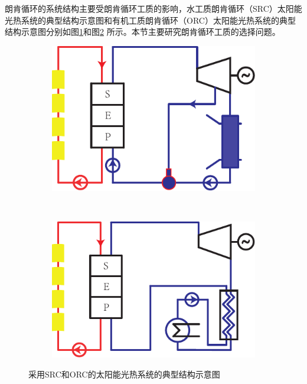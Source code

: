 朗肯循环的系统结构主要受朗肯循环工质的影响，水工质朗肯循环（SRC）太阳能光热系统的典型结构示意图和有机工质朗肯循环（ORC）太阳能光热系统的典型结构示意图分别如图\ref{fig:TypicalSteamRankineSolarSystem}和图\ref{fig:TypicalOrganicRankineSolarSystem}
所示。本节主要研究朗肯循环工质的选择问题。

\noindent \begin{figure}[htbp]
\centering
	\begin{subfigure}[b]{0.4\columnwidth}
	\includegraphics[width = \columnwidth]{fig/TypicalSteamRankineSolarSystem}
	\caption{}\label{fig:TypicalSteamRankineSolarSystem}
	\end{subfigure}
	~
\begin{subfigure}[b]{0.4\columnwidth}
	\includegraphics[width = \columnwidth]{fig/TypicalOrganicRankineSolarSystem}
	\caption{}\label{fig:TypicalOrganicRankineSolarSystem}
	\end{subfigure}
	\caption{采用SRC和ORC的太阳能光热系统的典型结构示意图}
	\label{fig:TwoTypesOfRankineCycle}
\end{figure}


